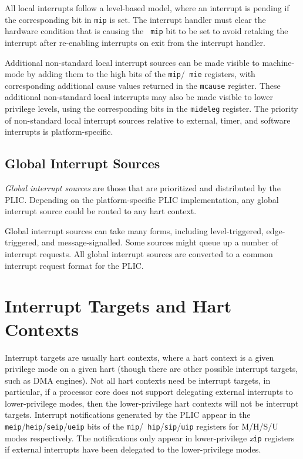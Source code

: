 All local interrupts follow a level-based model, where an interrupt is
pending if the corresponding bit in {\tt mip} is set.  The interrupt
handler must clear the hardware condition that is causing the {\tt
  mip} bit to be set to avoid retaking the interrupt after re-enabling
interrupts on exit from the interrupt handler.

Additional non-standard local interrupt sources can be made visible to
machine-mode by adding them to the high bits of the {\tt mip}/{\tt
  mie} registers, with corresponding additional cause values returned
in the {\tt mcause} register.  These additional non-standard local
interrupts may also be made visible to lower privilege levels, using
the corresponding bits in the {\tt mideleg} register.  The priority of
non-standard local interrupt sources relative to external, timer, and
software interrupts is platform-specific.

\subsection{Global Interrupt Sources}

{\em Global interrupt sources} are those that are prioritized and
distributed by the PLIC.  Depending on the platform-specific PLIC
implementation, any global interrupt source could be routed to any
hart context.

Global interrupt sources can take many forms, including
level-triggered, edge-triggered, and message-signalled.  Some sources
might queue up a number of interrupt requests.  All global interrupt
sources are converted to a common interrupt request format for the
PLIC.

\section{Interrupt Targets and Hart Contexts}

Interrupt targets are usually hart contexts, where a hart context is a
given privilege mode on a given hart (though there are other possible
interrupt targets, such as DMA engines).  Not all hart contexts need
be interrupt targets, in particular, if a processor core does not
support delegating external interrupts to lower-privilege modes, then
the lower-privilege hart contexts will not be interrupt targets.
Interrupt notifications generated by the PLIC appear in the {\tt
  meip}/{\tt heip}/{\tt seip}/{\tt ueip} bits of the {\tt mip}/{\tt
  hip}/{\tt sip}/{\tt uip} registers for M/H/S/U modes respectively.
The notifications only appear in lower-privilege {\em x}{\tt ip}
registers if external interrupts have been delegated to the
lower-privilege modes.

